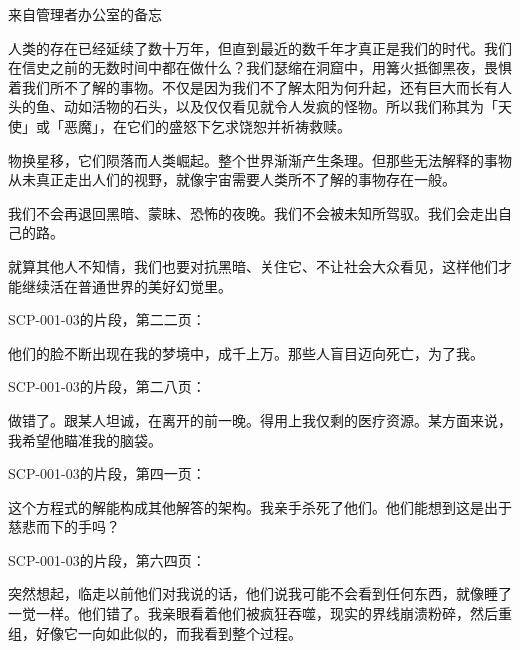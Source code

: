 \begin{scpbox}

来自管理者办公室的备忘

人类的存在已经延续了数十万年，但直到最近的数千年才真正是我们的时代。我们在信史之前的无数时间中都在做什么？我们瑟缩在洞窟中，用篝火抵御黑夜，畏惧着我们所不了解的事物。不仅是因为我们不了解太阳为何升起，还有巨大而长有人头的鱼、动如活物的石头，以及仅仅看见就令人发疯的怪物。所以我们称其为「天使」或「恶魔」，在它们的盛怒下乞求饶恕并祈祷救赎。

物换星移，它们陨落而人类崛起。整个世界渐渐产生条理。但那些无法解释的事物从未真正走出人们的视野，就像宇宙需要人类所不了解的事物存在一般。

我们不会再退回黑暗、蒙昧、恐怖的夜晚。我们不会被未知所驾驭。我们会走出自己的路。

就算其他人不知情，我们也要对抗黑暗、关住它、不让社会大众看见，这样他们才能继续活在普通世界的美好幻觉里。

\end{scpbox}

SCP-001-03的片段，第二二页：

\begin{scpbox}

他们的脸不断出现在我的梦境中，成千上万。那些人盲目迈向死亡，为了我。

\end{scpbox}

SCP-001-03的片段，第二八页：

\begin{scpbox}

做错了。跟某人坦诚，在离开的前一晚。得用上我仅剩的医疗资源。某方面来说，我希望他瞄准我的脑袋。

\end{scpbox}

SCP-001-03的片段，第四一页：

\begin{scpbox}

这个方程式的解能构成其他解答的架构。我亲手杀死了他们。他们能想到这是出于慈悲而下的手吗？

\end{scpbox}

SCP-001-03的片段，第六四页：

\begin{scpbox}

突然想起，临走以前他们对我说的话，他们说我可能不会看到任何东西，就像睡了一觉一样。他们错了。我亲眼看着他们被疯狂吞噬，现实的界线崩溃粉碎，然后重组，好像它一向如此似的，而我看到整个过程。

\end{scpbox}

